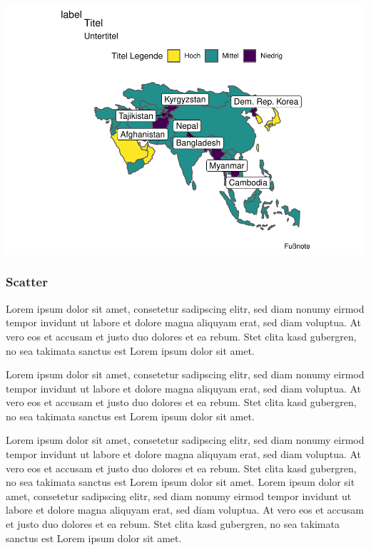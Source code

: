 \documentclass[
  twocolumn]{article}
\begin{document}
\includegraphics{PDFoutputsamples_files/figure-latex/unnamed-chunk-4-1.pdf}

\newpage

\hypertarget{scatter}{%
\subsubsection{Scatter}\label{scatter}}

Lorem ipsum dolor sit amet, consetetur sadipscing elitr, sed diam nonumy
eirmod tempor invidunt ut labore et dolore magna aliquyam erat, sed diam
voluptua. At vero eos et accusam et justo duo dolores et ea rebum. Stet
clita kasd gubergren, no sea takimata sanctus est Lorem ipsum dolor sit
amet.

Lorem ipsum dolor sit amet, consetetur sadipscing elitr, sed diam nonumy
eirmod tempor invidunt ut labore et dolore magna aliquyam erat, sed diam
voluptua. At vero eos et accusam et justo duo dolores et ea rebum. Stet
clita kasd gubergren, no sea takimata sanctus est Lorem ipsum dolor sit
amet.

\twocolumn

Lorem ipsum dolor sit amet, consetetur sadipscing elitr, sed diam nonumy
eirmod tempor invidunt ut labore et dolore magna aliquyam erat, sed diam
voluptua. At vero eos et accusam et justo duo dolores et ea rebum. Stet
clita kasd gubergren, no sea takimata sanctus est Lorem ipsum dolor sit
amet. Lorem ipsum dolor sit amet, consetetur sadipscing elitr, sed diam
nonumy eirmod tempor invidunt ut labore et dolore magna aliquyam erat,
sed diam voluptua. At vero eos et accusam et justo duo dolores et ea
rebum. Stet clita kasd gubergren, no sea takimata sanctus est Lorem
ipsum dolor sit amet.
\end{document}
